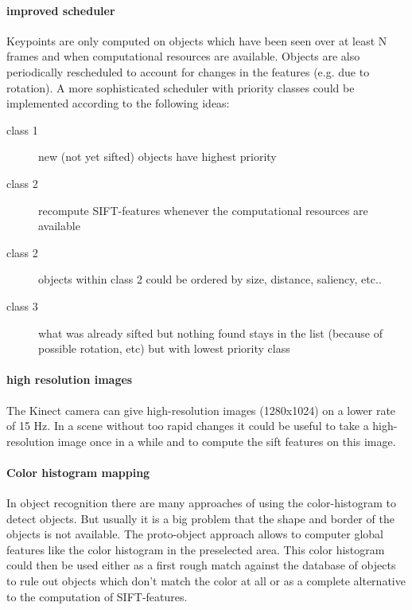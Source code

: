 \paragraph{improved scheduler} %
\label{par:improved_scheduler}
Keypoints are only computed on objects which have been seen over at least N frames and when computational resources are available. Objects are also periodically rescheduled to account for changes in the features (e.g. due to rotation). A more sophisticated scheduler with priority classes could be implemented according to the following ideas:
\begin{description}
    \item[class 1] new (not yet sifted) objects have highest priority
    \item[class 2] recompute SIFT-features whenever the computational resources are available
    \item[class 2] objects within class 2 could be ordered by size, distance, saliency, etc..
    \item[class 3] what was already sifted but nothing found stays in the list (because of possible rotation, etc) but with lowest priority class
\end{description}

\paragraph{high resolution images} %
\label{par:high_resolution_images}
The Kinect camera can give high-resolution images (1280x1024) on a lower rate of 15 Hz. In a scene without too rapid changes it could be useful to take a high-resolution image once in a while and to compute the sift features on this image. 

\paragraph{Color histogram mapping} %
\label{par:color_histogram_mapping}
In object recognition there are many approaches of using the color-histogram to detect objects. But usually it is a big problem that the shape and border of the objects is not available. The proto-object approach allows to computer global features like the color histogram in the preselected area. This color histogram could then be used either as a first rough match against the database of objects to rule out objects which don't match the color at all or as a complete alternative to the computation of SIFT-features.

